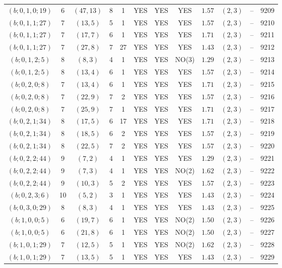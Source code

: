 \begin{longtable}{|c|c|c|c|c|c|c|c|c|c|c|c|}
$(b;0,1,0;19)$ & 6 & $(47,13)$ & 8 & 1 & YES & YES & YES & $1.57$ & $(2,3)$ & -- & 9209\\
$(b;0,1,1;27)$ & 7 & $(13,5)$ & 5 & 1 & YES & YES & YES & $1.57$ & $(2,3)$ & -- & 9210\\
$(b;0,1,1;27)$ & 7 & $(17,7)$ & 6 & 1 & YES & YES & YES & $1.71$ & $(2,3)$ & -- & 9211\\
$(b;0,1,1;27)$ & 7 & $(27,8)$ & 7 & 27 & YES & YES & YES & $1.43$ & $(2,3)$ & -- & 9212\\
$(b;0,1,2;5)$ & 8 & $(8,3)$ & 4 & 1 & YES & YES & NO(3) & $1.29$ & $(2,3)$ & -- & 9213\\
$(b;0,1,2;5)$ & 8 & $(13,4)$ & 6 & 1 & YES & YES & YES & $1.57$ & $(2,3)$ & -- & 9214\\
$(b;0,2,0;8)$ & 7 & $(13,4)$ & 6 & 1 & YES & YES & YES & $1.71$ & $(2,3)$ & -- & 9215\\
$(b;0,2,0;8)$ & 7 & $(22,9)$ & 7 & 2 & YES & YES & YES & $1.57$ & $(2,3)$ & -- & 9216\\
$(b;0,2,0;8)$ & 7 & $(25,9)$ & 7 & 1 & YES & YES & YES & $1.71$ & $(2,3)$ & -- & 9217\\
$(b;0,2,1;34)$ & 8 & $(17,5)$ & 6 & 17 & YES & YES & YES & $1.71$ & $(2,3)$ & -- & 9218\\
$(b;0,2,1;34)$ & 8 & $(18,5)$ & 6 & 2 & YES & YES & YES & $1.57$ & $(2,3)$ & -- & 9219\\
$(b;0,2,1;34)$ & 8 & $(22,5)$ & 7 & 2 & YES & YES & YES & $1.57$ & $(2,3)$ & -- & 9220\\
$(b;0,2,2;44)$ & 9 & $(7,2)$ & 4 & 1 & YES & YES & YES & $1.29$ & $(2,3)$ & -- & 9221\\
$(b;0,2,2;44)$ & 9 & $(7,3)$ & 4 & 1 & YES & YES & NO(2) & $1.62$ & $(2,3)$ & -- & 9222\\
$(b;0,2,2;44)$ & 9 & $(10,3)$ & 5 & 2 & YES & YES & YES & $1.57$ & $(2,3)$ & -- & 9223\\
$(b;0,2,3;6)$ & 10 & $(5,2)$ & 3 & 1 & YES & YES & YES & $1.43$ & $(2,3)$ & -- & 9224\\
$(b;0,3,0;29)$ & 8 & $(8,3)$ & 4 & 1 & YES & YES & YES & $1.43$ & $(2,3)$ & -- & 9225\\
$(b;1,0,0;5)$ & 6 & $(19,7)$ & 6 & 1 & YES & YES & NO(2) & $1.50$ & $(2,3)$ & -- & 9226\\
$(b;1,0,0;5)$ & 6 & $(21,8)$ & 6 & 1 & YES & YES & NO(2) & $1.50$ & $(2,3)$ & -- & 9227\\
$(b;1,0,1;29)$ & 7 & $(12,5)$ & 5 & 1 & YES & YES & NO(2) & $1.62$ & $(2,3)$ & -- & 9228\\
$(b;1,0,1;29)$ & 7 & $(13,5)$ & 5 & 1 & YES & YES & YES & $1.43$ & $(2,3)$ & -- & 9229\\

\end{longtable}
